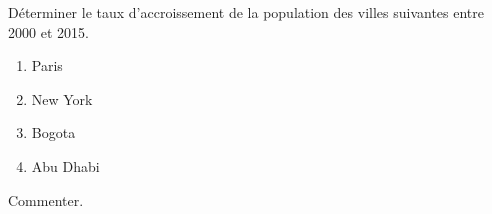 
Déterminer le taux d'accroissement de la population des villes suivantes entre 2000 et 2015.
\begin{enumerate}
\item Paris
\item New York
\item Bogota
\item Abu Dhabi
\end{enumerate}
Commenter.